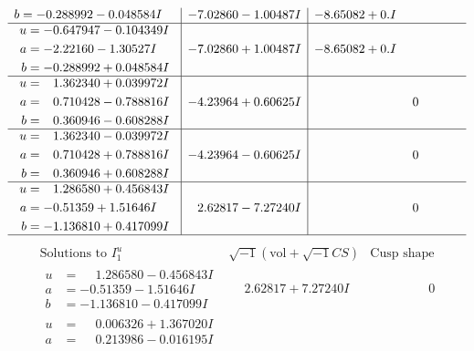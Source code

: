 \documentclass[1p]{elsarticle_modified}
\theoremstyle{definition}
\newcommand{\I}{\sqrt{-1}}
\begin{document}
$$\begin{array}{c|c|c}
\begin{aligned}
b &= -0.288992 - 0.048584 I\end{aligned}
 & -7.02860 - 1.00487 I & -8.65082 + 0. I\phantom{ +0.000000I} \\ \hline\begin{aligned}
u &= -0.647947 - 0.104349 I \\
a &= -2.22160 - 1.30527 I \\
b &= -0.288992 + 0.048584 I\end{aligned}
 & -7.02860 + 1.00487 I & -8.65082 + 0. I\phantom{ +0.000000I} \\ \hline\begin{aligned}
u &= \phantom{-}1.362340 + 0.039972 I \\
a &= \phantom{-}0.710428 - 0.788816 I \\
b &= \phantom{-}0.360946 - 0.608288 I\end{aligned}
 & -4.23964 + 0.60625 I & \phantom{-0.000000 } 0 \\ \hline\begin{aligned}
u &= \phantom{-}1.362340 - 0.039972 I \\
a &= \phantom{-}0.710428 + 0.788816 I \\
b &= \phantom{-}0.360946 + 0.608288 I\end{aligned}
 & -4.23964 - 0.60625 I & \phantom{-0.000000 } 0 \\ \hline\begin{aligned}
u &= \phantom{-}1.286580 + 0.456843 I \\
a &= -0.51359 + 1.51646 I \\
b &= -1.136810 + 0.417099 I\end{aligned}
 & \phantom{-}2.62817 - 7.27240 I & \phantom{-0.000000 } 0\\
 \hline 
 \end{array}$$\newpage$$\begin{array}{c|c|c}  
\text{Solutions to }I^u_{1}& \I (\text{vol} + \sqrt{-1}CS) & \text{Cusp shape}\\
 \hline 
\begin{aligned}
u &= \phantom{-}1.286580 - 0.456843 I \\
a &= -0.51359 - 1.51646 I \\
b &= -1.136810 - 0.417099 I\end{aligned}
 & \phantom{-}2.62817 + 7.27240 I & \phantom{-0.000000 } 0 \\ \hline\begin{aligned}
u &= \phantom{-}0.006326 + 1.367020 I \\
a &= \phantom{-}0.213986 - 0.016195 I \\

\end{aligned}
\end{array}$$
\end{document}
